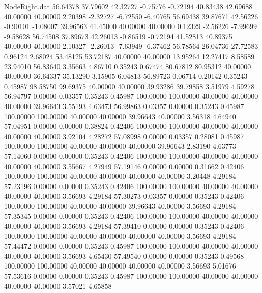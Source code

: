 \begin{filecontents}{NodeRight.dat}
  56.64378   37.79602   42.32727    -0.75776   -0.72194   40.83438   42.69688   40.00000   40.00000    2.20398   -2.32727   -6.72550   -6.40765
  56.69438   39.87671   42.56226    -0.90101   -1.08007   39.96563   41.45000   40.00000   40.00000    0.12329   -2.56226   -7.99699   -9.58628
  56.74508   37.89673   42.26013    -0.86519   -0.72194   41.52813   40.89375   40.00000   40.00000    2.10327   -2.26013   -7.63949   -6.37462
  56.78564   26.04736   27.72583     0.96124    2.68024   53.48125   53.72187   40.00000   40.00000   13.95264   12.27417    8.58589   23.94010
  56.83640    3.35663    4.86710     0.35243    0.67474   80.67812   80.95312   40.00000   40.00000   36.64337   35.13290    3.15905    6.04813
  56.89723    0.06714    0.20142     0.35243    0.45987   98.58750   99.69375   40.00000   40.00000   39.93286   39.79858    3.51979    4.59278
  56.94797    0.00000    0.03357     0.35243    0.45987  100.00000  100.00000   40.00000   40.00000   40.00000   39.96643    3.55193    4.63473
  56.99863    0.03357    0.00000     0.35243    0.45987  100.00000  100.00000   40.00000   40.00000   39.96643   40.00000    3.56318    4.64940
  57.04951    0.00000    0.00000     0.38824    0.42406  100.00000  100.00000   40.00000   40.00000   40.00000   40.00000    3.92104    4.28272
  57.08998    0.00000    0.03357     0.28081    0.45987  100.00000  100.00000   40.00000   40.00000   40.00000   39.96643    2.83190    4.63773
  57.14060    0.00000    0.00000     0.35243    0.42406  100.00000  100.00000   40.00000   40.00000   40.00000   40.00000    3.55667    4.27949
  57.19146    0.00000    0.00000     0.31662    0.42406  100.00000  100.00000   40.00000   40.00000   40.00000   40.00000    3.20448    4.29184
  57.23196    0.00000    0.00000     0.35243    0.42406  100.00000  100.00000   40.00000   40.00000   40.00000   40.00000    3.56693    4.29184
  57.30273    0.03357    0.00000     0.35243    0.42406  100.00000  100.00000   40.00000   40.00000   39.96643   40.00000    3.56693    4.29184
  57.35345    0.00000    0.00000     0.35243    0.42406  100.00000  100.00000   40.00000   40.00000   40.00000   40.00000    3.56693    4.29184
  57.39410    0.00000    0.00000     0.35243    0.42406  100.00000  100.00000   40.00000   40.00000   40.00000   40.00000    3.56693    4.29184
  57.44472    0.00000    0.00000     0.35243    0.45987  100.00000  100.00000   40.00000   40.00000   40.00000   40.00000    3.56693    4.65430
  57.49540    0.00000    0.00000     0.35243    0.49568  100.00000  100.00000   40.00000   40.00000   40.00000   40.00000    3.56693    5.01676
  57.53616    0.00000    0.00000     0.35243    0.45987  100.00000  100.00000   40.00000   40.00000   40.00000   40.00000    3.57021    4.65858

\end{filecontents}
